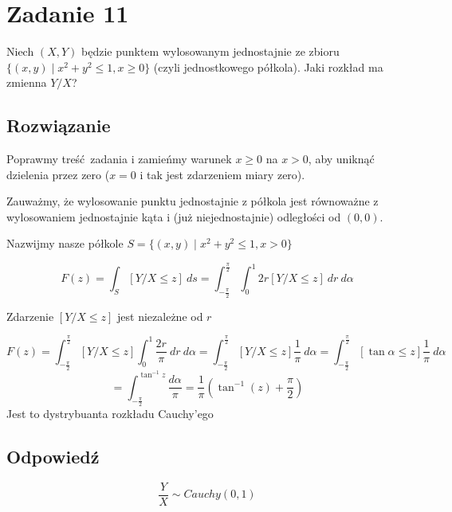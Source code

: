\section{Zadanie 11}
Niech \((X, Y)\) będzie punktem wylosowanym jednostajnie ze zbioru
\(\{(x, y) \mid x^2+y^2 \leqslant 1, x \geqslant 0\}\)
(czyli jednostkowego półkola).
Jaki rozkład ma zmienna \(Y/X\)?
\subsection*{Rozwiązanie}
Poprawmy treść zadania i zamieńmy warunek \(x\geqslant0\) na \(x>0\),
aby uniknąć dzielenia przez zero (\(x=0\) i tak jest zdarzeniem
miary zero).

Zauważmy, że wylosowanie punktu jednostajnie z półkola jest równoważne
z wylosowaniem jednostajnie kąta i (już niejednostajnie) odległości
od \((0, 0)\).

Nazwijmy nasze półkole
\(S = \{(x, y) \mid x^2+y^2 \leqslant 1, x > 0\}\)

\[
	F(z) = \int_{S} [Y/X \leqslant z]~ds
	= \int_{-\frac{\pi}2}^{\frac{\pi}2}
	\int_{0}^{1} 2r[Y/X \leqslant z]~dr~d\alpha
\]

Zdarzenie \([Y/X \leqslant z]\) jest niezależne od \(r\)

\[
	F(z)
	= \int_{-\frac{\pi}2}^{\frac{\pi}2}[Y/X \leqslant z] \int_{0}^{1}
	\frac{2r}{\pi}~dr~d\alpha
	= \int_{-\frac{\pi}2}^{\frac{\pi}2}[Y/X \leqslant z]
	\frac{1}{\pi}~d\alpha
	= \int_{-\frac{\pi}2}^{\frac{\pi}2}[\tan \alpha \leqslant z]
	\frac{1}{\pi} ~d\alpha
\]
\[
	= \int_{-\frac{\pi}2}^{\tan^{-1}z} \frac{d\alpha}{\pi}
	= \frac{1}{\pi} \left(\tan^{-1} (z) + \frac{\pi}2\right)
\]
Jest to dystrybuanta rozkładu Cauchy'ego

\subsection*{Odpowiedź}
\[
	\boxed{\frac{Y}{X} \sim Cauchy (0,1)}
\]
